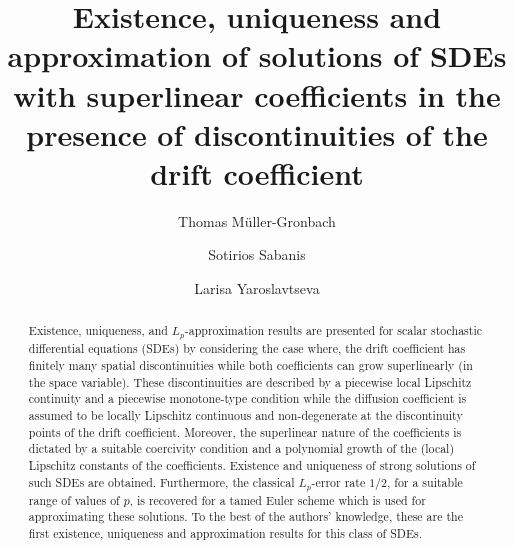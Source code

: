 \documentclass[11pt]{amsart}
\theoremstyle{plain}
\theoremstyle{definition}
\begin{document}
\title[]{Existence, uniqueness and approximation of solutions of SDEs with superlinear coefficients in the presence of discontinuities of the drift coefficient}



\author[M\"uller-Gronbach]
{Thomas M\"uller-Gronbach}
\address{
Faculty of Computer Science and Mathematics\\
University of Passau\\
Innstrasse 33 \\
94032 Passau\\
Germany} 


\author[Sabanis]
{Sotirios Sabanis}
\address{
School of Mathematics\\
University of Edinburgh\\
James Clerk Maxwell Building \\
Peter Guthrie Tait Road\\
Edinburgh\\
EH9 3FD\\
Scotland} 

 	













\author[Yaroslavtseva]
{Larisa Yaroslavtseva}
\address{
Faculty of Computer Science and Mathematics\\
University of Passau\\
Innstrasse 33 \\
94032 Passau\\
Germany} 


\begin{abstract}
Existence, uniqueness, and $L_p$-approximation results are presented for
scalar stochastic differential equations (SDEs)   by considering the case where, the drift coefficient has finitely many spatial discontinuities while both coefficients can grow superlinearly (in the space variable).
These discontinuities are described by a piecewise local Lipschitz continuity and a piecewise monotone-type condition   while the diffusion coefficient is assumed to be locally Lipschitz continuous and  non-degenerate at the discontinuity points of the drift coefficient. Moreover, the superlinear nature of the coefficients is dictated by a suitable coercivity condition and a polynomial growth of the  (local)  Lipschitz constants of the coefficients. Existence and uniqueness of strong solutions of such SDEs  are obtained. Furthermore, the classical $L_p$-error rate $1/2$, for  a   suitable range of   values of $p$, is recovered for a tamed Euler scheme which is used for approximating these solutions.
To the best of  the authors'  knowledge, these are the first existence, uniqueness and approximation results for  this class of   SDEs.
\end{abstract}
\maketitle
\end{document}
